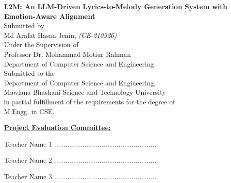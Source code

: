 \begin{titlepage}
\begin{center}
    \Large
    \textbf{L2M: An LLM-Driven Lyrics-to-Melody Generation System with Emotion-Aware Alignment}\\

    \vspace{2.5cm}
  \small{Submitted by}\\
    \large{Md Arafat Hasan Jenin, \small{\textit{(CE-210926)}}}\\

    \vspace{0.5cm}
   \small
     {Under the Supervision of}\\
     \large{Professor Dr. Mohammad Motiur Rahman}\\
     \normalsize{Department of Computer Science and Engineering}\\

    \vspace{0.5cm}
       \small{Submitted to the}\\
    \large{Department of Computer Science and Engineering,}\\
    \normalsize{Mawlana Bhashani Science and Technology University\\
    in partial fulfillment of the requirements for the degree of\\
    M.Engg. in CSE.}

\end{center}


\vspace{1.5cm}
\large
\underline{\textbf{Project Evaluation Committee:}}

\vspace{1cm}

Teacher Name 1 ......................................................

\vspace{1cm}

Teacher Name 2 ......................................................

\vspace{1cm}
Teacher Name 3 ......................................................
\end{titlepage}

